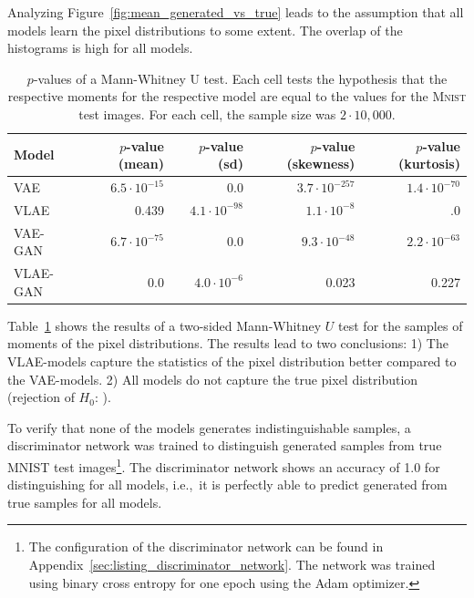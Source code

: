 Analyzing Figure~\ref{fig:mean_generated_vs_true} leads to the assumption that all models learn the pixel distributions to some extent.
The overlap of the histograms is high for all models.
\begin{table}
    \begin{tabular}{lrrrr}
        \toprule
        Model              & $p$-value (mean)    & $p$-value (sd)      & $p$-value (skewness) & $p$-value (kurtosis) \\
        \midrule
        \ac{VAE}           & $6.5\cdot 10^{-15}$ & 0.0                 & $3.7\cdot 10^{-257}$ & $1.4\cdot 10^{-70}$  \\
        \ac{VLAE}          & 0.439               & $4.1\cdot 10^{-98}$ & $1.1\cdot 10^{-8}$   & .0                   \\
        \ac{VAE}-\ac{GAN}  & $6.7\cdot 10^{-75}$ & 0.0                 & $9.3\cdot 10^{-48}$  & $2.2\cdot 10^{-63}$  \\
        \ac{VLAE}-\ac{GAN} & 0.0                 & $4.0\cdot 10^{-6}$  & 0.023                & 0.227                \\
        \bottomrule
    \end{tabular}
    \caption{$p$-values of a Mann-Whitney U test. Each cell tests the hypothesis that the respective moments for the respective model are equal to the values for the \textsc{Mnist} test images. For each cell, the sample size was $2\cdot 10,000$.}
    \label{tab:vae-vlae-mnist}
\end{table}
Table~\ref{tab:vae-vlae-mnist} shows the results of a two-sided Mann-Whitney $U$ test for the samples of moments of the pixel distributions.
The results lead to two conclusions: 1) The \ac{VLAE}-models capture the statistics of the pixel distribution better compared to the \ac{VAE}-models.
2) All models do not capture the true pixel distribution (rejection of $H_0$: ).

To verify that none of the models generates indistinguishable samples, a discriminator network was trained to distinguish generated samples from true \textsc{MNIST} test images\footnote{The configuration of the discriminator network can be found in Appendix~\ref{sec:listing_discriminator_network}. The network was trained using binary cross entropy for one epoch using the Adam optimizer.}.
The discriminator network shows an accuracy of 1.0 for distinguishing for all models, i.e.,~it is perfectly able to predict generated from true samples for all models.

